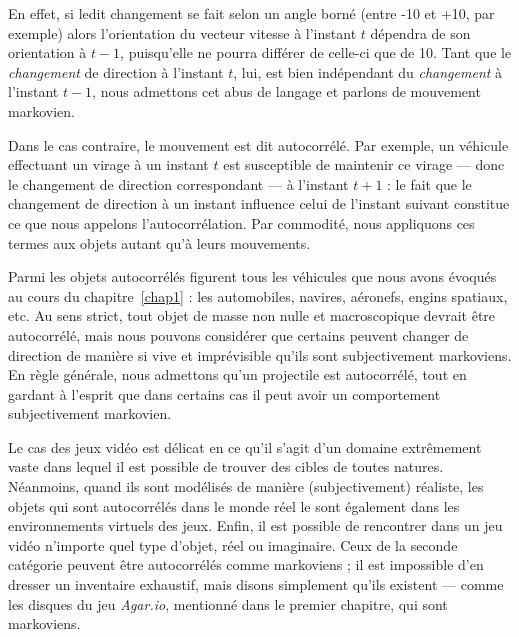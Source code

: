 	En effet, si ledit changement se fait selon un angle borné (entre -10\textdegree{} et +10\textdegree{}, par exemple) alors l'orientation du vecteur vitesse à l'instant $t$ dépendra de son orientation à $t-1$, puisqu'elle ne pourra différer de celle-ci que de 10\textdegree{}. Tant que le \emph{changement} de direction à l'instant $t$, lui, est bien indépendant du \emph{changement} à l'instant $t-1$, nous admettons cet abus de langage et parlons de mouvement markovien.
	
	Dans le cas contraire, le mouvement est dit autocorrélé. Par exemple, un véhicule effectuant un virage à un instant $t$ est susceptible de maintenir ce virage --- donc le changement de direction correspondant --- à l'instant $t+1$ : le fait que le changement de direction à un instant influence celui de l'instant suivant constitue ce que nous appelons l'autocorrélation. Par commodité, nous appliquons ces termes aux objets autant qu'à leurs mouvements.

	Parmi les objets autocorrélés figurent tous les véhicules que nous avons évoqués au cours du chapitre~\ref{chap1} : les automobiles, navires, aéronefs, engins spatiaux, etc. Au sens strict, tout objet de masse non nulle et macroscopique devrait être autocorrélé, mais nous pouvons considérer que certains peuvent changer de direction de manière si vive et imprévisible qu'ils sont subjectivement markoviens. En règle générale, nous admettons qu'un projectile est autocorrélé, tout en gardant à l'esprit que dans certains cas il peut avoir un comportement subjectivement markovien.
	
	Le cas des jeux vidéo est délicat en ce qu'il s'agit d'un domaine extrêmement vaste dans lequel il est possible de trouver des cibles de toutes natures. Néanmoins, quand ils sont modélisés de manière (subjectivement) réaliste, les objets qui sont autocorrélés dans le monde réel le sont également dans les environnements virtuels des jeux. Enfin, il est possible de rencontrer dans un jeu vidéo n'importe quel type d'objet, réel ou imaginaire. Ceux de la seconde catégorie peuvent être autocorrélés comme markoviens ; il est impossible d'en dresser un inventaire exhaustif, mais disons simplement qu'ils existent --- comme les disques du jeu \emph{Agar.io}, mentionné dans le premier chapitre, qui sont markoviens.

